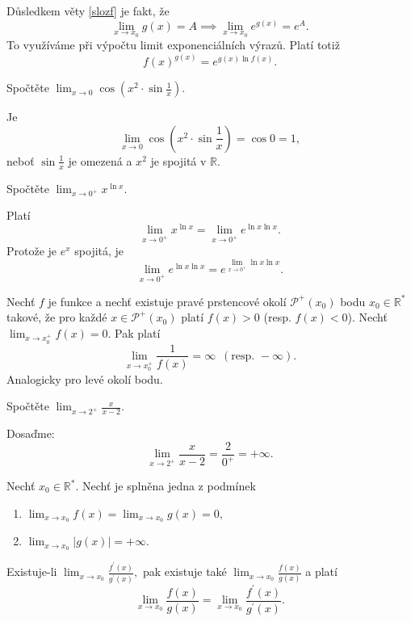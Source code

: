 \begin{pozn}
    Důsledkem věty \ref{slozf} je fakt, že
    $$\lim_{x\to x_0}g(x)=A \implies \lim_{x\to x_0}e^{g(x)}=e^A.$$
    To využíváme při výpočtu limit exponenciálních výrazů. Platí totiž
    $$f(x)^{g(x)}=e^{g(x)\ln f(x)}.$$
\end{pozn}

\begin{priklad}
Spočtěte $\lim_{x\to 0} \cos \left ( x^2\cdot \sin \frac{1}{x} \right ) $.
\end{priklad}

\begin{reseni}
Je
$$\lim_{x\to 0} \cos \left ( x^2\cdot \sin \frac{1}{x} \right ) =\cos 0 =1,$$
neboť $\sin \frac{1}{x}$ je omezená a $x^2$ je spojitá v $\mathbb R$.
\end{reseni}

\begin{priklad}
Spočtěte $\lim_{x\to 0^+}x^{\ln x}.$
\end{priklad}

\begin{reseni}
Platí
$$\lim_{x\to 0^+}x^{\ln x}=\lim_{x\to 0^+}e^{\ln x\ln x}.$$
Protože je $e^x$ spojitá, je
$$\lim_{x\to 0^+}e^{\ln x\ln x}=e^{\lim_{x\to 0^+}\ln x\ln x}.$$
\end{reseni}

\begin{veta}
Nechť $f$ je funkce a nechť existuje pravé prstencové okolí $\mathscr P^+(x_0)$ bodu
$x_0\in \mathbb R^*$ takové, že pro každé $x\in \mathscr P^+(x_0)$ platí
$f(x)>0$ (resp. $f(x)<0$). Nechť $\lim_{x\to x_0^+}f(x)=0.$ Pak platí
$$\lim_{x\to x_0^+} \frac{1}{f(x)}=\infty \,\,\, (\textrm{resp. } -\infty).$$
Analogicky pro levé okolí bodu.
\end{veta}

\begin{priklad}
Spočtěte $\lim_{x\to 2^+}\frac{x}{x-2}.$
\end{priklad}

\begin{reseni}
Dosaďme:
 $$\lim_{x\to 2^+}\frac{x}{x-2}=\frac{2}{0^+}=+\infty.$$
\end{reseni}

\begin{veta}
Nechť $x_0\in \mathbb R^*$. Nechť je splněna jedna z podmínek
\begin{enumerate}[$i.$]
\item $\lim_{x\to x_0}f(x)=\lim_{x\to x_0}g(x)=0,$
\item $\lim_{x\to x_0}|g(x)| = +\infty.$
\end{enumerate}
Existuje-li $\lim_{x\to x_0}\frac{f^\prime (x)}{g^\prime (x)},$ pak existuje také
$\lim_{x\to x_0}\frac{f(x)}{g(x)}$ a platí
$$\lim_{x\to x_0}\frac{f(x)}{g(x)}=\lim_{x\to x_0}\frac{f^\prime (x)}{g^\prime(x)}.$$
\end{veta}


